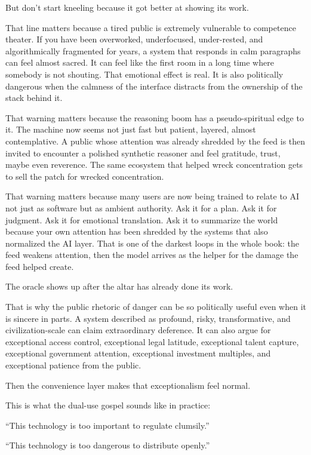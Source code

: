 \documentclass[
  american,
  12pt,
  letterpaper,
]{article}
\begin{document}
But don't start kneeling because it got better at showing its work.

That line matters because a tired public is extremely vulnerable to
competence theater. If you have been overworked, underfocused,
under-rested, and algorithmically fragmented for years, a system that
responds in calm paragraphs can feel almost sacred. It can feel like the
first room in a long time where somebody is not shouting. That emotional
effect is real. It is also politically dangerous when the calmness of
the interface distracts from the ownership of the stack behind it.

That warning matters because the reasoning boom has a pseudo-spiritual
edge to it. The machine now seems not just fast but patient, layered,
almost contemplative. A public whose attention was already shredded by
the feed is then invited to encounter a polished synthetic reasoner and
feel gratitude, trust, maybe even reverence. The same ecosystem that
helped wreck concentration gets to sell the patch for wrecked
concentration.

That warning matters because many users are now being trained to relate
to AI not just as software but as ambient authority. Ask it for a plan.
Ask it for judgment. Ask it for emotional translation. Ask it to
summarize the world because your own attention has been shredded by the
systems that also normalized the AI layer. That is one of the darkest
loops in the whole book: the feed weakens attention, then the model
arrives as the helper for the damage the feed helped create.

The oracle shows up after the altar has already done its work.

That is why the public rhetoric of danger can be so politically useful
even when it is sincere in parts. A system described as profound, risky,
transformative, and civilization-scale can claim extraordinary
deference. It can also argue for exceptional access control, exceptional
legal latitude, exceptional talent capture, exceptional government
attention, exceptional investment multiples, and exceptional patience
from the public.

Then the convenience layer makes that exceptionalism feel normal.

This is what the dual-use gospel sounds like in practice:

``This technology is too important to regulate clumsily.''

``This technology is too dangerous to distribute openly.''
\end{document}
